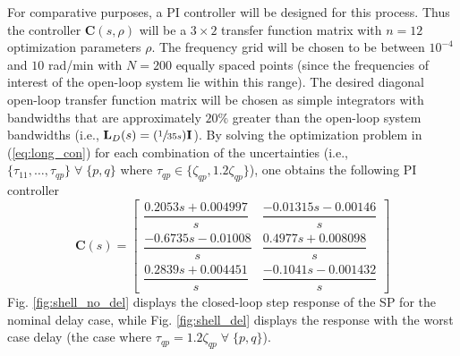 \documentclass[A4, 10pt, conference]{ieeeconf}
\renewcommand{\vec}[1]{\mathbf{#1}}
\begin{document}
For comparative purposes, a PI controller will be designed for this process. Thus the controller $\vec{C}(s,\rho)$ will be a $3 \times 2$ transfer function matrix with $n=12$ optimization parameters $\rho$. 
The frequency grid will be chosen to be between $10^{-4}$ and $10$ rad/min with $N=200$ equally spaced points (since the frequencies of interest of the open-loop system lie within this range). The desired diagonal open-loop transfer function matrix will be chosen as simple integrators with bandwidths that are approximately $20\%$ greater than the open-loop system bandwidths (i.e., $\vec{L}_D(s)=(\sfrac{1}{35s})\vec{I}$). By solving the optimization problem in (\ref{eq:long_con}) for each combination of the uncertainties (i.e., $\{\tau_{11},\ldots,\tau_{qp}\} \; \forall \; \{p,q\}$ where $\tau_{qp} \in \{\zeta_{qp},1.2\zeta_{qp}\} $), one obtains the following PI controller
$$
\renewcommand{\arraystretch}{1.3}
\vec{C}(s)=
\begin{bmatrix}
\dfrac{0.2053s + 0.004997}{s} & \dfrac{-0.01315s - 0.00146}{s} \\[0.4em]
\dfrac{-0.6735s - 0.01008}{s} & \dfrac{0.4977s + 0.008098}{s} \\[0.4em]
\dfrac{0.2839s + 0.004451}{s} & \dfrac{-0.1041s - 0.001432}{s}
\end{bmatrix}
$$
Fig. \ref{fig:shell_no_del} displays the closed-loop step response of the SP for the nominal delay case, while Fig. \ref{fig:shell_del} displays the response with the worst case delay (the case where $\tau_{qp}=1.2\zeta_{qp} \; \forall \; \{p,q\}$). 
\end{document}
